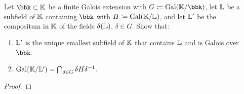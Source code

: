 \begin{problem}
  Let $\bbk\subset\bbK$ be a finite Galois extension with
  $G\coloneq\Gal(\bbK/\bbk)$, let $\mathbb{L}$ be a subfield of $\mathbb{K}$ containing
  $\bbk$ with $H\coloneq\operatorname{Gal}(\mathbb{K}/\mathbb{L})$, and let $\mathbb{L}'$ be the compositum
  in $\mathbb{K}$ of the fields $\delta(\mathbb{L})$, $\delta\in G$. Show that:
\begin{enumerate}[label=(\alph*),noitemsep]
\item $\mathbb{L}'$ is the unique smallest subfield of $\mathbb{K}$ that contains
  $\mathbb{L}$ and is Galois over $\bbk$.
\item $\operatorname{Gal}(\mathbb{K}/\mathbb{L}')=\bigcap_{\delta\in G}\delta H\delta^{-1}$.
\end{enumerate}
\end{problem}
\begin{proof}
\end{proof}

